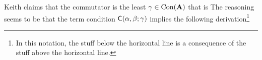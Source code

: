Keith claims that the commutator is the least $\gamma\in \operatorname{Con} (\mathbf{A})$
that is 
The reasoning seems to be that the term condition $\mathsf{C}(\alpha, \beta; \gamma)$ implies
the following derivation\footnote{In this notation, the stuff below the horizontal line
  is a consequence of the stuff above the horizontal line.}
